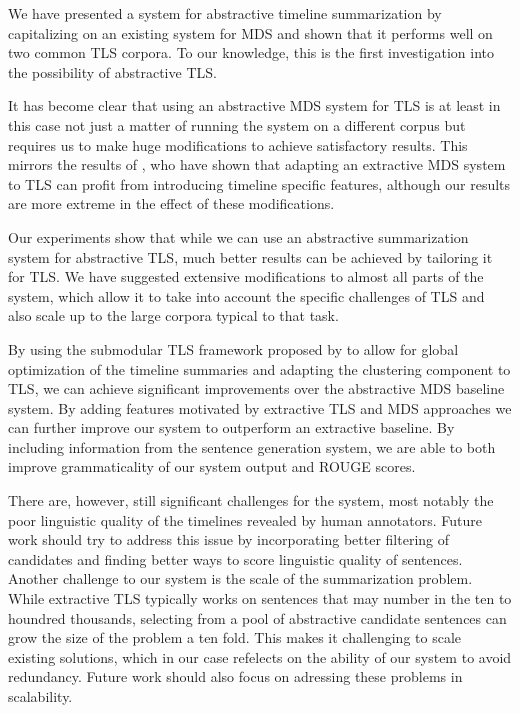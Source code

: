 \documentclass[a4paper,BCOR=10mm]{report}
\numberwithin{lemma}{chapter}
\numberwithin{definition}{chapter}
\begin{document}
We have presented a system for abstractive timeline summarization by capitalizing on an existing system for MDS and shown that it performs well on two common TLS corpora. To our knowledge, this is the first investigation into the possibility of abstractive TLS.

It has become clear that using an abstractive MDS system for TLS is at least in this case not just a matter of running the system on a different corpus but requires us to make huge modifications to achieve satisfactory results. This mirrors the results of \citet{markert}, who have shown that adapting an extractive MDS system to TLS can profit from introducing timeline specific features, although our results are more extreme in the effect of these modifications.

Our experiments show that while we can use an abstractive summarization system for abstractive TLS, much better results can be achieved by tailoring it for TLS.
We have suggested extensive modifications to almost all parts of the system, which allow it to take into account the specific challenges of TLS and also scale up to the large corpora typical to that task.

By using the submodular TLS framework proposed by \citet{markert} to allow for global optimization of the timeline summaries and adapting the clustering component to TLS, we can achieve significant improvements over the abstractive MDS baseline system.
By adding features motivated by extractive TLS and MDS approaches we can further improve our system to outperform an extractive baseline.
By including information from the sentence generation system, we are able to both improve grammaticality of our system output and ROUGE scores.

There are, however, still significant challenges for the system, most notably the poor linguistic quality of the timelines revealed by human annotators.
Future work should try to address this issue by incorporating better filtering of candidates and finding better ways to score linguistic quality of sentences.
Another challenge to our system is the scale of the summarization problem. While extractive TLS typically works on sentences that may number in the ten to houndred thousands, selecting from a pool of abstractive candidate sentences can grow the size of the problem a ten fold. This makes it challenging to scale existing solutions, which in our case refelects on the ability of our system to avoid redundancy.
Future work should also focus on adressing these problems in scalability.
\end{document}
